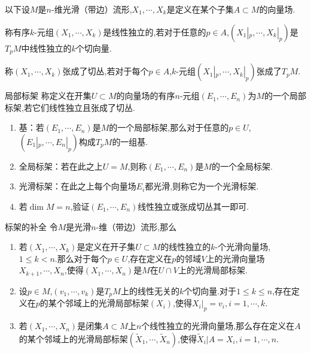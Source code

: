 \documentclass[../../几何与拓扑.tex]{subfiles}
\begin{document}
以下设$M$是$n$-维光滑（带边）流形,$X_{1},{\cdots},X_{k}$是定义在某个子集$A\subset M$的向量场.

\begin{definition}
    称有序$k$-元组$\left( X_{1},{\cdots},X_{k} \right)$是线性独立的,若对于任意的$p \in A$,$\left( X_{1}|_{p},{\cdots},X_{k}|_{p} \right)$是$T_{p}M$中线性独立的$k$个切向量.
\end{definition}

\begin{definition}
    称$\left( X_{1},{\cdots},X_{k} \right)$张成了切丛,若对于每个$p \in A$,$k$-元组$\left( X_{1}|_{p},{\cdots},X_{k}|_{p} \right)$张成了$T_{p}M$.
\end{definition}

\begin{definition}{局部标架}
    称定义在开集$U\subset M$的向量场的有序$n$-元组$\left( E_{1},{\cdots},E_{n} \right)$为$M$的一个局部标架,若它们线性独立且张成了切丛.
\end{definition}

\begin{remark}
    \begin{enumerate}
        \item 基：若$\left( E_{1},{\cdots},E_{n} \right)$是$M$的一个局部标架,那么对于任意的$p \in U$,$\left( E_{1}|_{p},{\cdots},E_{n}|_{p} \right)$构成$T_{p}M$的一组基.
        \item 全局标架：若在此之上$U=M$,则称$\left( E_{1},{\cdots},E_{n} \right)$是$M$的一个全局标架.
        \item 光滑标架：在此之上每个向量场$E_{i}$都光滑,则称它为一个光滑标架.
        \item 若$\operatorname{dim}M=n$,验证$\left( E_{1},{\cdots},E_{n} \right)$线性独立或张成切丛其一即可.
    \end{enumerate}
    
\end{remark}

\begin{proposition}{标架的补全}
    令$M$是光滑$n$-维（带边）流形,那么
    \begin{enumerate}
        \item 若$\left( X_{1},{\cdots},X_{k} \right)$是定义在开子集$U\subset M$的线性独立的$k$-个光滑向量场,$1\leqslant k <n$.那么对于每个$p \in U$,存在定义在$p$的邻域$V$上的光滑向量场$X_{k+1},{\cdots},X_{n}$,使得$\left( X_{1},{\cdots},X_{n} \right)$是$M$在$U\cap V$上的光滑局部标架.
        \item 设$p \in M$,$\left( v_{1},{\cdots},v_{k} \right)$是$T_{p}M$上的线性无关的$k$个切向量.对于$1\leqslant k \leqslant n$,存在定义在$p$的某个邻域上的光滑局部标架$\left(  X_{i}\right)$,使得$X_{i}|_{p}= v_{i},i=1,{\cdots},k$.
        \item 若$\left( X_{1},{\cdots},X_{n} \right)$是闭集$A\subset M$上$n$个线性独立的光滑向量场,那么存在定义在$A$的某个邻域上的光滑局部标架$\left( \tilde{X}_{1},{\cdots},\tilde{X}_{n} \right)$,使得$\tilde{X}_{i}|A= X_{i}, i=1,{\cdots},n$.
    \end{enumerate}
    
\end{proposition}
\end{document}
